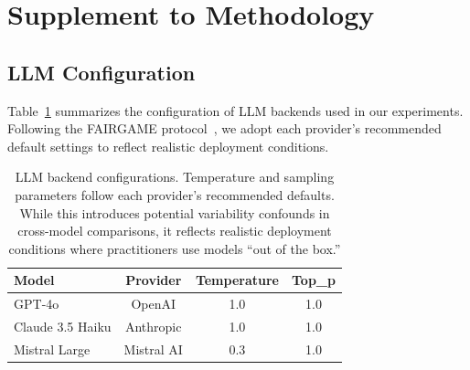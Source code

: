 \documentclass{article}
\begin{document}




\newpage
\setcounter{figure}{0}
\setcounter{equation}{0}
\renewcommand*{\thefigure}{A\arabic{figure}}
\renewcommand*{\theequation}{A\arabic{equation}}

\appendix

\maketitle

\setcounter{figure}{0}
\setcounter{equation}{0}
\setcounter{table}{0}
\renewcommand*{\thefigure}{A\arabic{figure}}
\renewcommand*{\theequation}{A\arabic{equation}}
\renewcommand*{\thetable}{A\arabic{table}}



\section{Supplement to Methodology}

\subsection{LLM Configuration}
\label{appendix:llm_config}

Table~\ref{tab:llm_config} summarizes the configuration of LLM backends used in our experiments. Following the FAIRGAME protocol~\cite{buscemi2025fairgame}, we adopt each provider's recommended default settings to reflect realistic deployment conditions.

\begin{table}[ht]
\centering
\footnotesize
\begin{tabular}{lccc}
\toprule
\textbf{Model} & \textbf{Provider} & \textbf{Temperature} & \textbf{Top\_p} \\
\midrule
GPT-4o & OpenAI & 1.0 & 1.0 \\
Claude 3.5 Haiku & Anthropic & 1.0 & 1.0 \\
Mistral Large & Mistral AI & 0.3 & 1.0 \\
\bottomrule
\end{tabular}
\caption{LLM backend configurations. Temperature and sampling parameters follow each provider's recommended defaults. While this introduces potential variability confounds in cross-model comparisons, it reflects realistic deployment conditions where practitioners use models ``out of the box.''}
\label{tab:llm_config}
\end{table}
\end{document}
